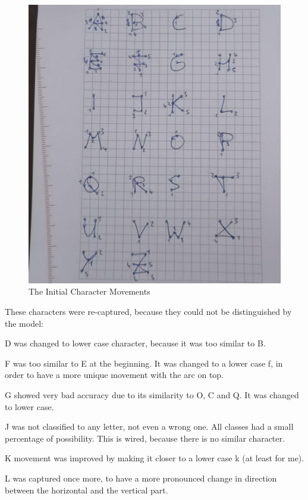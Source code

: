 \documentclass[a4paper,titlepage]{article}
\begin{document}
\begin{figure}[H]
    \includegraphics[width=\textwidth]{characters.jpg}
    \caption{The Initial Character Movements}
\end{figure}

These characters were re-captured, because they could not be distinguished by the model:

D was changed to lower case character, because it was too similar to B.

F was too similar to E at the beginning.
It was changed to a lower case f, in order to have a more unique movement with the arc on top.

G showed very bad accuracy due to its similarity to O, C and Q.
It was changed to lower case.

J was not classified to any letter, not even a wrong one.
All classes had a small percentage of possibility.
This is wired, because there is no similar character.

K movement was improved by making it closer to a lower case k (at least for me).

L was captured once more, to have a more pronounced change in direction between the horizontal and the vertical part.
\end{document}
